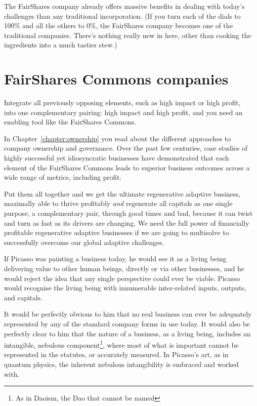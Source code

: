 The FairShares company already offers massive benefits in dealing with today's challenges than any traditional incorporation. (If you turn each of the dials to 100\% and all the others to 0\%, the FairShares company becomes one of the traditional companies. There's nothing really new in here, other than cooking the ingredients into a much tastier stew.)




\section{FairShares Commons companies}
\label{section:fairshares-commons}
Integrate all previously opposing elements, such as high impact or high profit, into one complementary pairing: high impact and high profit, and you need an enabling tool like the FairShares Commons.


In Chapter~\ref{chapter:ownership} you read about the different approaches to company ownership and governance. Over the past few centuries, case studies of highly successful yet idiosyncratic businesses have demonstrated that each element of the FairShares Commons leads to superior business outcomes across a wide range of metrics, including profit.


Put them all together and we get the ultimate regenerative adaptive business, maximally able to thrive profitably \emph{and} regenerate all capitals as one single purpose, a complementary pair, through good times and bad, because it can twist and turn as fast as its drivers are changing. We need the full power of financially profitable regenerative adaptive businesses if we are going to multisolve to successfully overcome our global adaptive challenges.


If Picasso  was painting a business today, he would see it as a living being delivering value to other human beings, directly or via other businesses, and he would reject the idea that any single perspective could ever be viable. Picasso would recognise the living being with innumerable inter-related inputs, outputs, and capitals. 


It would be perfectly obvious to him that no real business can ever be adequately represented by any of the standard company forms in use today. It would also be perfectly clear to him that the nature of a business, as a living being, includes an intangible, nebulous component\footnote{As in Daoism, the Dao that cannot be named},  where most of what is important cannot be represented in the statutes, or accurately measured. In Picasso's art, as in quantum physics, the inherent nebulous intangibility is embraced and worked with.


